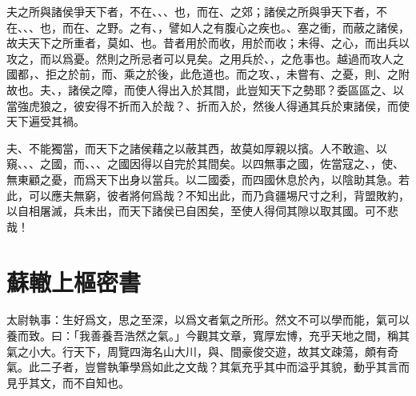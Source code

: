 夫之所與諸侯爭天下者，不在、、、也，而在、之郊；諸侯之所與爭天下者，不在、、、也，而在、之野。之有、，譬如人之有腹心之疾也。、塞之衝，而蔽之諸侯，故夫天下之所重者，莫如、也。昔者用於而收，用於而收；未得、之心，而出兵以攻之，而以爲憂。然則之所忌者可{以}見矣。之用兵於、，之危事也。越過而攻人之國都，、拒之於前，而、乘之於後，此危道也。而之攻、，未嘗有、之憂，則、之附故也。夫、，諸侯之障，而使人得出入於其間，此豈知天下之勢耶？委區區之、以當強虎狼之，彼安得不折而入於哉？、折而入於，然後人得通其兵於東諸侯，而使天下{遍}受其禍。%

夫、不能獨當，而天下之諸侯藉之以蔽其西，故莫如厚親以擯。人不敢逾、以窺、、、之國，而、、、之國因得以自完於其間矣。以四無事之國，佐當寇之、，使、無東顧之憂，而爲天下出身以當兵。以二國委，而四國休息於內，以陰助其急。若此，可以應夫無窮，彼者將何爲哉？不知出此，而乃貪疆埸尺寸之利，背盟敗約，以自相屠滅，兵未出，而天下諸侯已自困矣，至{使}人得伺其隙以取其國。可不悲哉！%

\theendnotes

\section[上樞密韓太尉書\quad{\small 蘇轍}]{{\normalsize 蘇轍}\quad 上樞密書}
太尉執事：生好爲文，思之至深，以爲文者氣之所形。然文不可以學而能，氣可以養而致。曰：「我善養吾浩然之氣。」今觀其文章，寬厚宏博，充乎天地之間，稱其氣之小大。行天下，周覽四海名山大川，與、間豪俊交{遊}，故其文疎蕩，頗有奇氣。此二子者，豈嘗執筆學爲如此之文哉？其氣充乎其中而溢乎其貌，動乎其言而見乎其文，而不自知也。%

